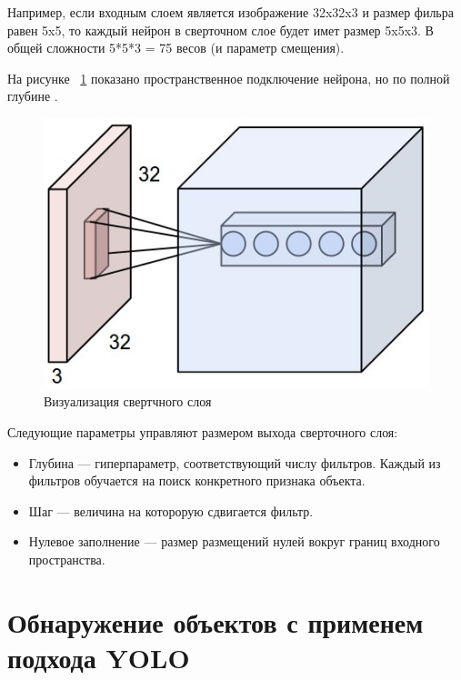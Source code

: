 \documentclass[a4paper,english,russian]{G2-105}
\begin{document}
\par Например, если входным слоем является изображение 32x32x3 и размер фильра равен 5x5, то каждый нейрон в сверточном слое будет имет размер 5x5x3. В общей сложности 5*5*3 = 75 весов (и параметр смещения). 
\par На рисунке ~\ref{depthcol} показано пространственное подключение нейрона, но по полной глубине \cite{16}. 
\begin{figure}
    \includegraphics[width=0.5\linewidth]{depthcol.png}
    \caption{Визуализация свертчного слоя}
	\label{depthcol}
\end{figure}
\par Следующие параметры управляют размером выхода сверточного слоя:
\begin{itemize}
\item Глубина --- гиперпараметр, соответствующий числу фильтров. Каждый из фильтров обучается на поиск конкретного признака объекта.
\item Шаг --- величина на которорую сдвигается фильтр.
\item Нулевое заполнение --- размер размещений нулей вокруг границ входного пространства.
\end{itemize}
\ttl
\section{Обнаружение объектов с применем подхода YOLO}
\end{document}
